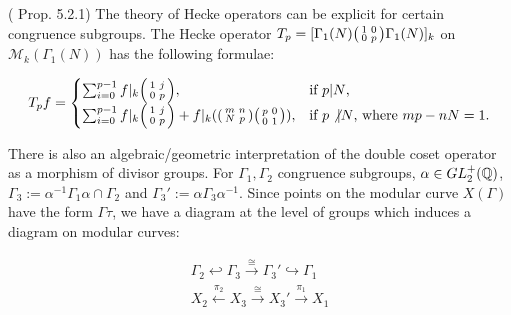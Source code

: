 \begin{example} (\cite{Shurman} Prop. 5.2.1)
The theory of Hecke operators can be explicit for certain congruence subgroups. The Hecke operator $T_p = [ \Gamma_1(N) \begin{psmallmatrix} 1 & 0 \\ 0 & p \end{psmallmatrix} \Gamma_1(N)]_k $ on $\mathcal{M}_k(\Gamma_1(N))$ has the following formulae:

\[T_p f =
\begin{cases}
\sum_{i = 0}^{p-1} f|_k \begin{psmallmatrix}
    1 & j \\ 0 & p \end{psmallmatrix}, & \text{if $p | N$,} \\
\sum_{i = 0}^{p-1} f|_k \begin{psmallmatrix}
    1 & j \\ 0 & p \end{psmallmatrix} + f|_k (\begin{psmallmatrix} m & n \\ N & p \end{psmallmatrix} \begin{psmallmatrix}
        p & 0 \\ 0 & 1
    \end{psmallmatrix}), & \text{if $p\not | N$, where $mp - nN = 1$.} \\
\end{cases} 
\]
\end{example}



There is also an algebraic/geometric interpretation of the double coset operator as a morphism of divisor groups. For $\Gamma_1, \Gamma_2$ congruence subgroups, $\alpha \in GL_2^+(\mathbb{Q}) $, $\Gamma_3 := \alpha^{-1} \Gamma_1 \alpha \cap \Gamma_2$ and $\Gamma_3' := \alpha \Gamma_3 \alpha^{-1}$. Since points on the modular curve $X(\Gamma)$ have the form $\Gamma \tau$, we have a diagram at the level of groups which induces a diagram on modular curves:


\begin{align*}
\Gamma_2 \hookleftarrow \Gamma_3 \xrightarrow{\cong} \Gamma_3' \hookrightarrow \Gamma_1 \\
X_2 \xleftarrow{\pi_2} X_3 \xrightarrow{\cong} X_3' \xrightarrow{\pi_1} X_1
\end{align*}

